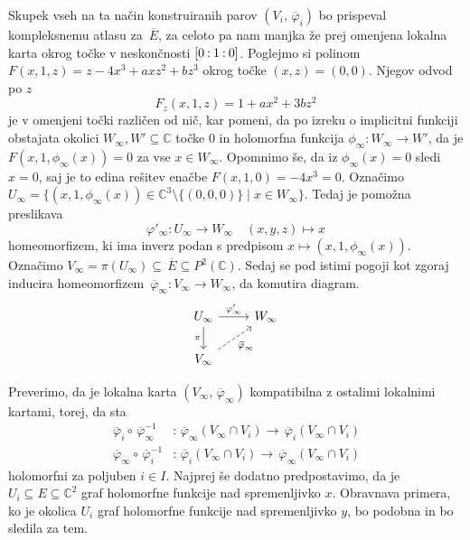 \documentclass[mat1]{fmfdelo}
\numberwithin{equation}{section}
\newcommand{\C}{\mathbb C}
\newcommand{\PC}{P^2(\mathbb C)}
\newcommand{\inv}{^{-1}}
\newcommand{\pcoor}[1]{%
\begingroup\lccode`~=`: \lowercase{\endgroup
\edef~}{\mathbin{\mathchar\the\mathcode`:}\nobreak}%
\left[%
\begingroup
\mathcode`:=\string"8000
#1%
\endgroup
\right]%
}
\newcommand{\olsi}[1]{\,\overline{\!{#1}}} %
\theoremstyle{definition}
\begin{document}
Skupek vseh na ta način konstruiranih parov $(V_i, \olsi{\varphi}_i)$ bo prispeval kompleksnemu atlasu za $\olsi{E}$, za celoto pa nam manjka že prej omenjena lokalna karta okrog točke v neskončnosti $\pcoor{0 : 1 : 0}$. Poglejmo si polinom $F(x, 1, z) = z - 4x^3 + axz^2 + bz^3$ okrog točke $(x,z) = (0,0)$. Njegov odvod po $z$ 
\[
    F_z(x,1,z) = 1 + ax^2 + 3bz^2
\]
je v omenjeni točki različen od nič, kar pomeni, da po izreku o implicitni funkciji obstajata okolici $W_\infty, W' \subseteq \C$ točke $0$ in holomorfna funkcija $\phi_\infty : W_\infty \to W'$, da je $F(x, 1, \phi_\infty(x)) = 0$ za vse $x \in W_\infty$. Opomnimo še, da iz $\phi_\infty(x) = 0$ sledi $x = 0$, saj je to edina rešitev enačbe $F(x, 1, 0) = -4x^3 = 0$. Označimo $U_\infty = \{(x, 1, \phi_\infty(x)) \in \C^3 \setminus \{(0,0,0)\}\mid x \in W_\infty\}$. Tedaj je pomožna preslikava 
\[
    \varphi'_\infty : U_\infty \to W_\infty \quad (x,y,z) \mapsto x
\]
homeomorfizem, ki ima inverz podan s predpisom $x \mapsto (x,1,\phi_\infty(x))$. Označimo $V_\infty = \pi(U_\infty) \subseteq \olsi{E} \subseteq \PC$. Sedaj se pod istimi pogoji kot zgoraj inducira homeomorfizem $\olsi{\varphi}_\infty : V_\infty \to W_\infty$, da komutira diagram.
\begin{equation}
    \label{projektivna karta v inf diagram}    
    \begin{tikzcd}
        U_\infty \arrow{r}{\varphi'_\infty} \ar[labels=left]{d}{\pi} & W_\infty \\
        V_\infty \ar[dashed, labels=below right]{ur}{\olsi{\varphi}_\infty}
    \end{tikzcd}
\end{equation}   

Preverimo, da je lokalna karta $(V_\infty, \olsi{\varphi}_\infty)$ kompatibilna z ostalimi lokalnimi kartami, torej, da sta
\begin{align*}
    \olsi{\varphi}_i \circ \olsi{\varphi}_\infty\inv &: \olsi{\varphi}_\infty(V_\infty \cap V_i) \to \olsi{\varphi}_i(V_\infty \cap V_i) \\
    \olsi{\varphi}_\infty \circ \olsi{\varphi}_i\inv &: \olsi{\varphi}_i(V_\infty \cap V_i) \to \olsi{\varphi}_\infty(V_\infty \cap V_i)
\end{align*}
holomorfni za poljuben $i \in I$. Najprej še dodatno predpostavimo, da je $U_i \subseteq E \subseteq \C^2$ graf holomorfne funkcije nad spremenljivko $x$. Obravnava primera, ko je okolica $U_i$ graf holomorfne funkcije nad spremenljivko $y$, bo podobna in bo sledila za tem.
\end{document}

